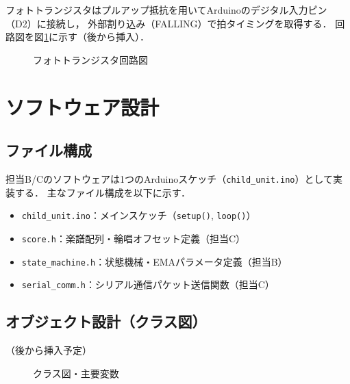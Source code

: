 フォトトランジスタはプルアップ抵抗を用いてArduinoのデジタル入力ピン（D2）に接続し，
外部割り込み（FALLING）で拍タイミングを取得する．
回路図を図\ref{fig:circuit-photo}に示す（後から挿入）．

\begin{figure}[H]
  \centering
  \caption{フォトトランジスタ回路図}
  \label{fig:circuit-photo}
\end{figure}

\section{ソフトウェア設計}

\subsection{ファイル構成}

担当B/Cのソフトウェアは1つのArduinoスケッチ（\texttt{child\_unit.ino}）として実装する．
主なファイル構成を以下に示す．

\begin{itemize}
  \item \texttt{child\_unit.ino}：メインスケッチ（\texttt{setup()}, \texttt{loop()}）
  \item \texttt{score.h}：楽譜配列・輪唱オフセット定義（担当C）
  \item \texttt{state\_machine.h}：状態機械・EMAパラメータ定義（担当B）
  \item \texttt{serial\_comm.h}：シリアル通信パケット送信関数（担当C）
\end{itemize}

\subsection{オブジェクト設計（クラス図）}

（後から挿入予定）

\begin{figure}[H]
  \centering
  \caption{クラス図・主要変数}
  \label{fig:class}
\end{figure}

